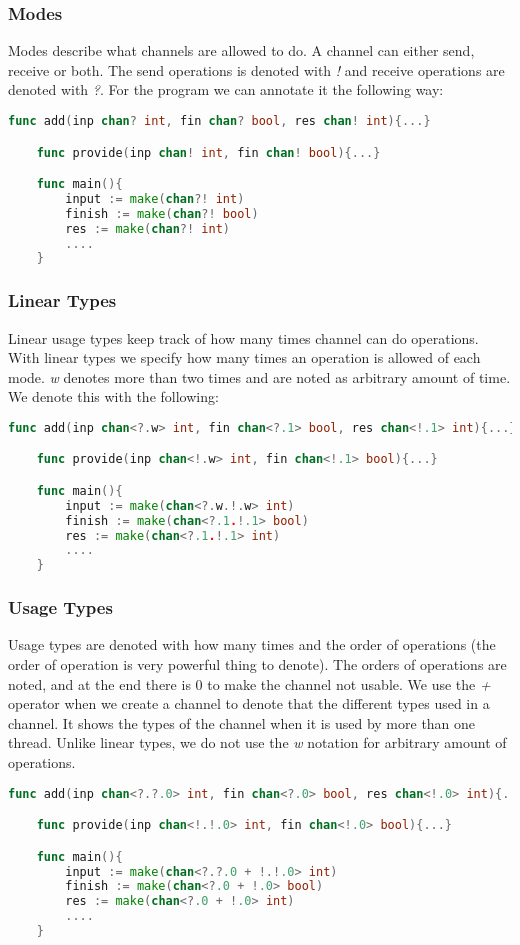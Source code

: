 \subsubsection{Modes}

Modes describe what channels are allowed to do. A channel can either send, receive or both. 
The send operations is denoted with \textit{!} and receive operations are denoted with \textit{?}.
For the program we can annotate it the following way: 

\begin{lstlisting}[language=go]
    func add(inp chan? int, fin chan? bool, res chan! int){...}

    func provide(inp chan! int, fin chan! bool){...}

    func main(){
        input := make(chan?! int)
        finish := make(chan?! bool)
        res := make(chan?! int)
        ....
    }
\end{lstlisting}

\subsubsection{Linear Types}

Linear usage types keep track of how many times channel can do operations. 
With linear types we specify how many times an operation is allowed of each mode. 
\textit{w} denotes more than two times and are noted as arbitrary amount of time. 
We denote this with the following: 

\begin{lstlisting}[language=go]
    func add(inp chan<?.w> int, fin chan<?.1> bool, res chan<!.1> int){...}

    func provide(inp chan<!.w> int, fin chan<!.1> bool){...}

    func main(){
        input := make(chan<?.w.!.w> int)
        finish := make(chan<?.1.!.1> bool)
        res := make(chan<?.1.!.1> int)
        ....
    }
\end{lstlisting}

\subsubsection{Usage Types}
Usage types are denoted with how many times and the order of operations (the order of operation is very powerful thing to denote). 
The orders of operations are noted, and at the end there is 0 to make the channel not usable.
We use the \textit{+} operator when we create a channel to denote that the different types used in a channel. 
It shows the types of the channel when it is used by more than one thread. 
Unlike linear types, we do not use the \textit{w} notation for arbitrary amount of operations. 

\begin{lstlisting}[language=go]
    func add(inp chan<?.?.0> int, fin chan<?.0> bool, res chan<!.0> int){...}

    func provide(inp chan<!.!.0> int, fin chan<!.0> bool){...}

    func main(){
        input := make(chan<?.?.0 + !.!.0> int)
        finish := make(chan<?.0 + !.0> bool)
        res := make(chan<?.0 + !.0> int)
        ....
    }
\end{lstlisting}
